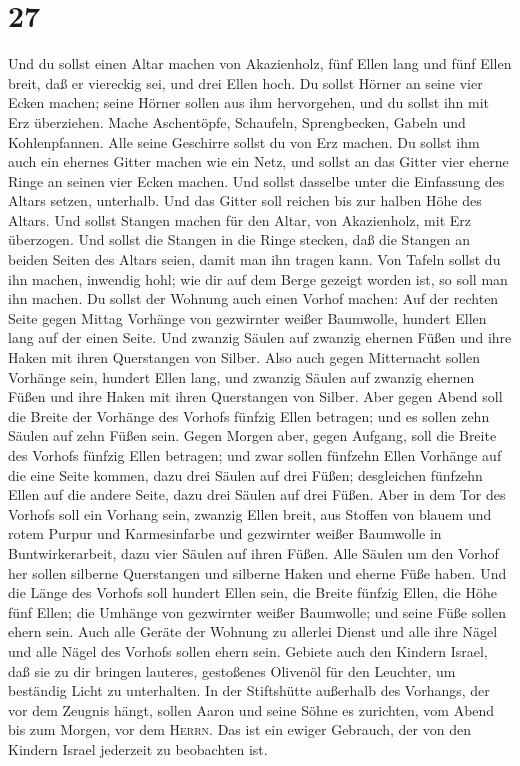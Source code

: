\hypertarget{section-26}{%
\section{27}\label{section-26}}

 Und du sollst einen Altar machen von Akazienholz, fünf
Ellen lang und fünf Ellen breit, daß er viereckig sei, und drei Ellen
hoch.  Du sollst Hörner an seine vier Ecken machen; seine
Hörner sollen aus ihm hervorgehen, und du sollst ihn mit Erz überziehen.
 Mache Aschentöpfe, Schaufeln, Sprengbecken, Gabeln und
Kohlenpfannen. Alle seine Geschirre sollst du von Erz machen.
 Du sollst ihm auch ein ehernes Gitter machen wie ein
Netz, und sollst an das Gitter vier eherne Ringe an seinen vier Ecken
machen.  Und sollst dasselbe unter die Einfassung des
Altars setzen, unterhalb. Und das Gitter soll reichen bis zur halben
Höhe des Altars.  Und sollst Stangen machen für den Altar,
von Akazienholz, mit Erz überzogen.  Und sollst die
Stangen in die Ringe stecken, daß die Stangen an beiden Seiten des
Altars seien, damit man ihn tragen kann.  Von Tafeln
sollst du ihn machen, inwendig hohl; wie dir auf dem Berge gezeigt
worden ist, so soll man ihn machen.  Du sollst der Wohnung
auch einen Vorhof machen: Auf der rechten Seite gegen Mittag Vorhänge
von gezwirnter weißer Baumwolle, hundert Ellen lang auf der einen Seite.
 Und zwanzig Säulen auf zwanzig ehernen Füßen und ihre
Haken mit ihren Querstangen von Silber.  Also auch gegen
Mitternacht sollen Vorhänge sein, hundert Ellen lang, und zwanzig Säulen
auf zwanzig ehernen Füßen und ihre Haken mit ihren Querstangen von
Silber.  Aber gegen Abend soll die Breite der Vorhänge
des Vorhofs fünfzig Ellen betragen; und es sollen zehn Säulen auf zehn
Füßen sein.  Gegen Morgen aber, gegen Aufgang, soll die
Breite des Vorhofs fünfzig Ellen betragen;  und zwar
sollen fünfzehn Ellen Vorhänge auf die eine Seite kommen, dazu drei
Säulen auf drei Füßen;  desgleichen fünfzehn Ellen auf
die andere Seite, dazu drei Säulen auf drei Füßen.  Aber
in dem Tor des Vorhofs soll ein Vorhang sein, zwanzig Ellen breit, aus
Stoffen von blauem und rotem Purpur und Karmesinfarbe und gezwirnter
weißer Baumwolle in Buntwirkerarbeit, dazu vier Säulen auf ihren Füßen.
 Alle Säulen um den Vorhof her sollen silberne
Querstangen und silberne Haken und eherne Füße haben. 
Und die Länge des Vorhofs soll hundert Ellen sein, die Breite fünfzig
Ellen, die Höhe fünf Ellen; die Umhänge von gezwirnter weißer Baumwolle;
und seine Füße sollen ehern sein.  Auch alle Geräte der
Wohnung zu allerlei Dienst und alle ihre Nägel und alle Nägel des
Vorhofs sollen ehern sein.  Gebiete auch den Kindern
Israel, daß sie zu dir bringen lauteres, gestoßenes Olivenöl für den
Leuchter, um beständig Licht zu unterhalten.  In der
Stiftshütte außerhalb des Vorhangs, der vor dem Zeugnis hängt, sollen
Aaron und seine Söhne es zurichten, vom Abend bis zum Morgen, vor dem
\textsc{Herrn}. Das ist ein ewiger Gebrauch, der von den Kindern Israel
jederzeit zu beobachten ist.


